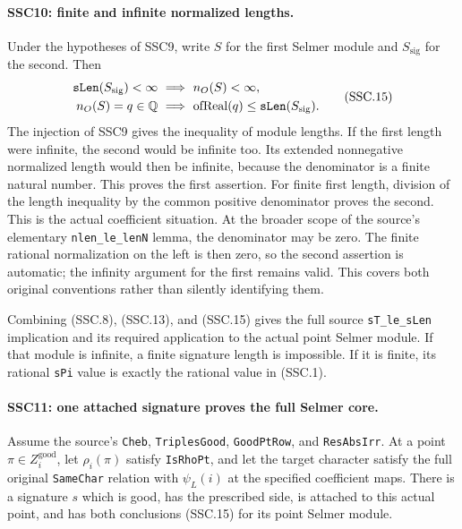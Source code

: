 \documentclass[11pt,a4paper]{article}
\numberwithin{equation}{section}
\theoremstyle{remark}\newtheorem{remark}[theorem]{Remark}
\begin{document}
\paragraph{SSC10: finite and infinite normalized lengths.}
\label{claim:SSC10}
Under the hypotheses of SSC9, write $S$ for the first Selmer module
and $S_{\mathrm{sig}}$ for the second. Then
\[
 \begin{split}
 \texttt{s\allowbreak Len}(S_{\mathrm{sig}})<\infty
      &\ \Longrightarrow\ n_O(S)<\infty,\\
 n_O(S)=q\in\mathbb Q
      &\ \Longrightarrow\ \operatorname{ofReal}(q)
                    \le\texttt{s\allowbreak Len}(S_{\mathrm{sig}}).
 \end{split}                                                   \tag{SSC.15}
\]
The injection of SSC9 gives the inequality of module lengths. If
the first length were infinite, the second would be infinite too.
Its extended nonnegative normalized length would then be infinite,
because the denominator is a finite natural number. This proves
the first assertion. For finite first length, division of the
length inequality by the common positive denominator proves the
second. This is the actual coefficient situation. At the broader
scope of the source's elementary \texttt{nlen\_\allowbreak le\_\allowbreak len\allowbreak N} lemma,
the denominator may be zero. The finite rational normalization
on the left is then zero, so the second assertion is automatic;
the infinity argument for the first remains valid. This covers
both original conventions rather than silently identifying them.

Combining (SSC.8), (SSC.13), and (SSC.15) gives the full source
\texttt{s\allowbreak T\_\allowbreak le\_\allowbreak s\allowbreak Len} implication and its required application to
the actual point Selmer module. If that module is infinite, a finite
signature length is impossible. If it is finite, its rational
\texttt{s\allowbreak Pi} value is exactly the rational value in (SSC.1).

\paragraph{SSC11: one attached signature proves the full Selmer core.}
\label{claim:SSC11}
Assume the source's \texttt{Cheb}, \texttt{Triples\allowbreak Good},
\texttt{Good\allowbreak Pt\allowbreak Row}, and \texttt{Res\allowbreak Abs\allowbreak Irr}. At a point
$\pi\in Z_i^{\mathrm{good}}$, let $\rho_i(\pi)$ satisfy
\texttt{Is\allowbreak Rho\allowbreak Pt}, and let the target character satisfy the full
original \texttt{Same\allowbreak Char} relation with $\psi_L(i)$ at the
specified coefficient maps. There is a signature $s$ which is
good, has the prescribed side, is attached to this actual point,
and has both conclusions (SSC.15) for its point Selmer module.
\end{document}
